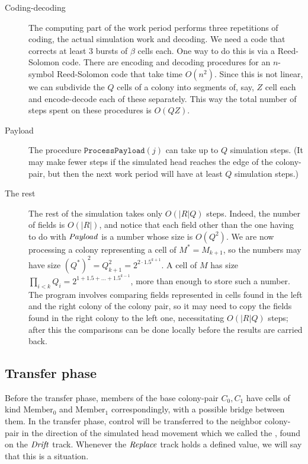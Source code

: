 \documentclass[11pt]{memoir}
\theoremstyle{definition} %
\newcommand{\fld}[1]{\ensuremath{\textit{#1\/}}}
\newcommand{\rul}[1]{\ensuremath{\texttt{#1}}}
\newcommand{\Q}{Q} %
\newcommand{\Z}{Z} %
\newcommand{\Drift}{\fld{Drift}}
\newcommand{\Payload}{\fld{Payload}}
\newcommand{\Replace}{\fld{Replace}}
\newcommand{\Member}{\mathrm{Member}}
\newcommand{\ProcessPayload}{\rul{ProcessPayload}}
\begin{document}
\begin{description}
\item[Coding-decoding]
The computing part of the work period performs three repetitions of
coding, the actual simulation work and decoding.
We need a code that corrects at least 3 bursts of  \( \beta \) cells each.
One way to do this is via a Reed-Solomon code.
There are encoding and decoding procedures for an \( n \)-symbol Reed-Solomon code
that take time \( O(n^{2}) \).
Since this is not linear, we can subdivide the \( \Q \) cells of a colony into segments of, say,
\( \Z \) cell each and encode-decode each of these separately.
This way the total number of steps spent on these procedures is \( O(\Q\Z) \).

\item[Payload]
The procedure \( \ProcessPayload(j) \) can take up to \( \Q \) simulation steps.
(It may make fewer steps if the simulated head reaches the edge of the colony-pair,
but then the next work period will have at least \( \Q \) simulation steps.)

\item[The rest]
The rest of the simulation takes only \( O(|R|\Q) \) steps.
Indeed, the number of fields is \( O(|R|) \), and notice that each field other than the one
having to do with \( \Payload \) is a number whose size is \( O(\Q^{2}) \).
We are now processing a colony representing a cell of \( M^{*}=M_{k+1} \), so the numbers
may have size \( (\Q^{*})^{2}=\Q_{k+1}^{2}=2^{2\cdot 1.5^{k+1}} \).
A cell of \( M \) has size \( \prod_{i<k}\Q_{i}=2^{1+1.5+\dots+1.5^{k-1}} \), more than enough
to store such a number.
The program involves comparing fields represented in cells found in the left and the right
colony of the colony pair, so it may need to copy the fields found in the right colony to the left one,
necessitating \( O(|R|\Q) \) steps; after this the comparisons can be done locally before the results
are carried back.
\end{description}

\subsection{Transfer phase}\label{sec:transfer}

Before the transfer phase, members of the base colony-pair \( C_{0},C_{1} \) have
cells of kind \( \Member_{0} \) and \( \Member_{1} \) correspondingly,
with a possible bridge between them.
In the transfer phase, control will be transferred to the
neighbor colony-pair in the direction of the simulated head movement which we called 
the , found on the \( \Drift \) track.
Whenever the \( \Replace \) track holds a defined value,
we will say that this is a  situation.
\end{document}
